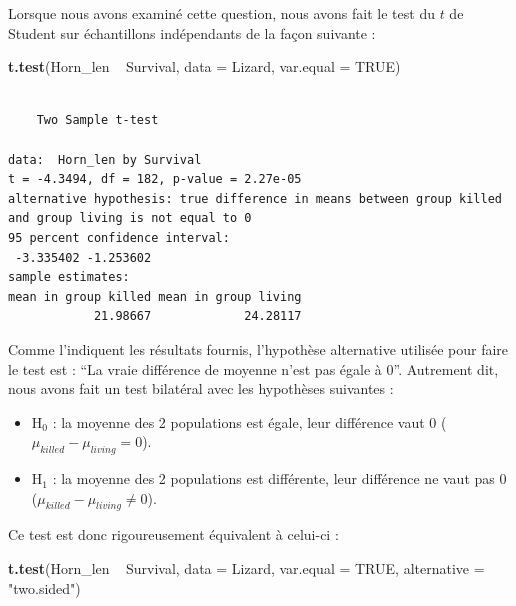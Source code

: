 \documentclass[
  a4paper,
]{article}
\newenvironment{Shaded}{\begin{snugshade}}{\end{snugshade}}
\newcommand{\DataTypeTok}[1]{\textcolor[rgb]{0.00,0.34,0.68}{#1}}
\newcommand{\KeywordTok}[1]{\textcolor[rgb]{0.12,0.11,0.11}{\textbf{#1}}}
\newcommand{\NormalTok}[1]{\textcolor[rgb]{0.12,0.11,0.11}{#1}}
\newcommand{\OperatorTok}[1]{\textcolor[rgb]{0.12,0.11,0.11}{#1}}
\newcommand{\OtherTok}[1]{\textcolor[rgb]{0.00,0.43,0.16}{#1}}
\newcommand{\StringTok}[1]{\textcolor[rgb]{0.75,0.01,0.01}{#1}}
\providecommand{\tightlist}{%
  \setlength{\itemsep}{0pt}\setlength{\parskip}{0pt}}
\begin{document}
Lorsque nous avons examiné cette question, nous avons fait le test du \(t\) de Student sur échantillons indépendants de la façon suivante :

\begin{Shaded}
\begin{Highlighting}[]
\KeywordTok{t.test}\NormalTok{(Horn_len }\OperatorTok{~}\StringTok{ }\NormalTok{Survival, }\DataTypeTok{data =}\NormalTok{ Lizard, }\DataTypeTok{var.equal =} \OtherTok{TRUE}\NormalTok{)}
\end{Highlighting}
\end{Shaded}

\begin{verbatim}

    Two Sample t-test

data:  Horn_len by Survival
t = -4.3494, df = 182, p-value = 2.27e-05
alternative hypothesis: true difference in means between group killed and group living is not equal to 0
95 percent confidence interval:
 -3.335402 -1.253602
sample estimates:
mean in group killed mean in group living 
            21.98667             24.28117 
\end{verbatim}

Comme l'indiquent les résultats fournis, l'hypothèse alternative utilisée pour faire le test est : ``La vraie différence de moyenne n'est pas égale à 0''. Autrement dit, nous avons fait un test bilatéral avec les hypothèses suivantes :

\begin{itemize}
\tightlist
\item
  H\(_0\) : la moyenne des 2 populations est égale, leur différence vaut 0 (\(\mu_{killed}-\mu_{living} = 0\)).
\item
  H\(_1\) : la moyenne des 2 populations est différente, leur différence ne vaut pas 0 (\(\mu_{killed}-\mu_{living} \neq 0\)).
\end{itemize}

Ce test est donc rigoureusement équivalent à celui-ci :

\begin{Shaded}
\begin{Highlighting}[]
\KeywordTok{t.test}\NormalTok{(Horn_len }\OperatorTok{~}\StringTok{ }\NormalTok{Survival, }
       \DataTypeTok{data =}\NormalTok{ Lizard, }\DataTypeTok{var.equal =} \OtherTok{TRUE}\NormalTok{,}
       \DataTypeTok{alternative =} \StringTok{"two.sided"}\NormalTok{)}
\end{Highlighting}
\end{Shaded}
\end{document}

